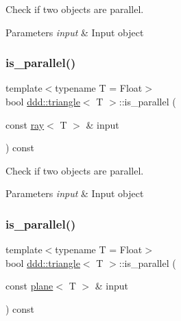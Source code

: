 Check if two objects are parallel. 


\begin{DoxyParams}{Parameters}
{\em input} & Input object \\
\hline
\end{DoxyParams}
\mbox{\label{classddd_1_1triangle_af3ef3664c5607056410abc1138e51f8f}} 
\subsubsection{\texorpdfstring{is\+\_\+parallel()}{is\_parallel()}\hspace{0.1cm}{\footnotesize\ttfamily [3/5]}}
{\footnotesize\ttfamily template$<$typename T = Float$>$ \\
bool \hyperlink{classddd_1_1triangle}{ddd\+::triangle}$<$ T $>$\+::is\+\_\+parallel (\begin{DoxyParamCaption}\item[{const \hyperlink{classddd_1_1ray}{ray}$<$ T $>$ \&}]{input }\end{DoxyParamCaption}) const\hspace{0.3cm}{\ttfamily [inline]}}



Check if two objects are parallel. 


\begin{DoxyParams}{Parameters}
{\em input} & Input object \\
\hline
\end{DoxyParams}
\mbox{\label{classddd_1_1triangle_af3ba7a91cfe813cadb2dac7f6d47cb99}} 
\subsubsection{\texorpdfstring{is\+\_\+parallel()}{is\_parallel()}\hspace{0.1cm}{\footnotesize\ttfamily [4/5]}}
{\footnotesize\ttfamily template$<$typename T = Float$>$ \\
bool \hyperlink{classddd_1_1triangle}{ddd\+::triangle}$<$ T $>$\+::is\+\_\+parallel (\begin{DoxyParamCaption}\item[{const \hyperlink{classddd_1_1plane}{plane}$<$ T $>$ \&}]{input }\end{DoxyParamCaption}) const\hspace{0.3cm}{\ttfamily [inline]}}




